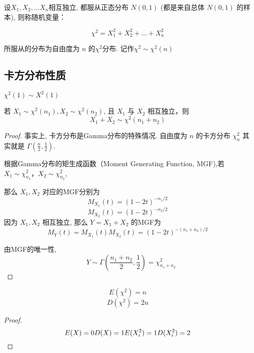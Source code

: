 \begin{definition}[卡方分布]
    设$X_1,X_2,...X_n$相互独立, 都服从正态分布 $N(0,1)$ (都是来自总体 $N(0,1)$ 的样本), 则称随机变量：

    $$
        \chi^2 = X_1^2 + X_2^2 + ... + X_n^2
    $$

    所服从的分布为自由度为 $n$ 的$\chi^2$分布. 记作$\chi^2 \sim \chi^2(n)$
\end{definition}

\subsection{卡方分布性质}

\begin{corollary}
    $\chi^2(1) \sim X^2(1)$
\end{corollary}

\begin{corollary}
    若 $ X_{1} \sim \chi^{2}\left(n_{1}\right), X_{2} \sim \chi^{2}\left(n_{2}\right) $, 且 $ X_{1} $ 与 $ X_{2} $ 相互独立，则
    $$
        X_{1}+X_{2} \sim \chi^{2}\left(n_{1}+n_{2}\right)
    $$
\end{corollary}

\begin{proof}
    事实上, 卡方分布是Gamma分布的特殊情况. 自由度为 $ n $ 的卡方分布 $ \chi_{n}^{2} $ 其实就是 $ \Gamma\left(\frac{n}{2}, \frac{1}{2}\right) $.

    根据Gamma分布的矩生成函数（Moment Generating Function, MGF),若$ X_{1} \sim \chi_{n_{1}}^{2} $，$ X_{2} \sim \chi_{n_{2}}^{2} $,

    那么 $ X_{1}, X_{2} $ 对应的MGF分别为
    $$ M_{X_{1}}(t)=(1-2 t)^{-n_{1} / 2} $$
    $$ M_{X_{2}}(t)=(1-2 t)^{-n_{2} / 2} $$
    因为 $ X_{1}, X_{2} $ 相互独立, 那么 $ Y=X_{1}+X_{2} $ 的MGF为
    $$ M_{Y}(t)=M_{X_{1}}(t) M_{X_{2}}(t)=(1-2 t)^{-\left(n_{1}+n_{2}\right) / 2} $$

    由MGF的唯一性,
    $$ \quad Y \sim \Gamma\left(\frac{n_{1}+n_{2}}{2}, \frac{1}{2}\right)=\chi_{n_{1}+n_{2}}^{2} $$
\end{proof}

\begin{corollary}
    $$E(\chi^2) = n$$
    $$D(\chi^2) = 2n$$
\end{corollary}

\begin{proof}
    $$
        E(X) = 0\\
        D(X) = 1\\
        E(X_i^2) = 1\\
        D(X_i^2) = 2
    $$
\end{proof}

